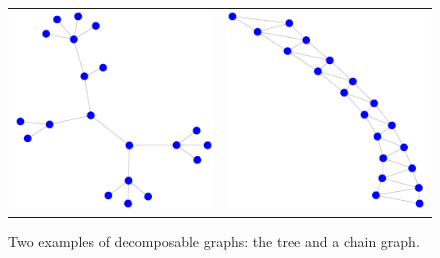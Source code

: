 \documentclass[a4paper]{article}
\begin{document}
\begin{figure}[h!]
\centering
\begin{tabular}{ll}
\includegraphics[angle=0, scale=0.4]{chordalGraph_tree_graph.eps} &
\includegraphics[angle=0, scale=0.4]{chordalGraph_chain_graph.eps}
\end{tabular}
\caption{Two examples of decomposable graphs: the tree and a chain graph. }
\label{figSM:examplesOfChordalGraph}
\end{figure}
\end{document}
